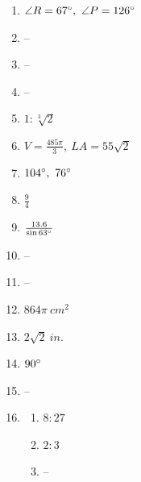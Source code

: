 \documentclass{article}
\begin{document}
\begin{enumerate}
\begin{enumerate}
	\item $\frac{1}{2}$
	
	\item $\frac{1}{8}$
	
	\item $100 \pi \ cm^3$
	
	\item $\frac{25 \pi}{2} \ cm^3$
	
	\end{enumerate}
	
\item $\angle R = 67 \degree, \ \angle P = 126 \degree$

\item --

\item --

\item --

\item $1 : \sqrt[3]{2}$

\item $V = \frac{485 \pi}{3}, \ LA = 55 \sqrt{2}$

\item $104 \degree, \ 76 \degree$

\item $\frac{9}{4}$

\item $\frac{13.6}{\sin{63 \degree}}$

\item --

\item --

\item $864 \pi \ cm^2$

\item $2 \sqrt{2} \ in.$

\item $90 \degree$

\item --

\item 

	\begin{enumerate}
	
	\item $8 : 27$
	
	\item $2 : 3$
	
	\item --
	
	\end{enumerate}
	

\end{enumerate}
\end{document}
